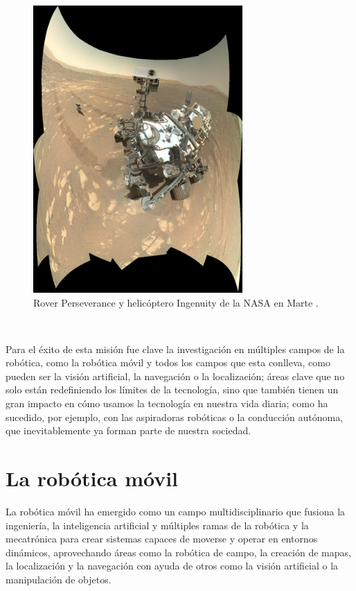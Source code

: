 \begin{figure} [h!]
  \begin{center}
    \includegraphics[width=8cm]{figs/perseverance_ingenuity_selfie_panorama}
  \end{center}
  \caption{Rover Perseverance y helicóptero Ingenuity de la NASA en Marte \cite{perseverance_ingenuity}.}
  \label{fig:rover}
\end{figure}\

Para el éxito de esta misión fue clave la investigación en múltiples campos de
la robótica, como la robótica móvil y todos los campos que esta conlleva, como
pueden ser la visión artificial, la navegación o la localización; áreas clave
que no solo están redefiniendo los límites de la tecnología, sino que también
tienen un gran impacto en cómo usamos la tecnología en nuestra vida diaria; como
ha sucedido, por ejemplo, con las aspiradoras robóticas o la conducción
autónoma, que inevitablemente ya forman parte de nuestra sociedad.



\section{La robótica móvil}
\label{sec:robotica_movil} %

La robótica móvil ha emergido como un campo multidisciplinario que fusiona la
ingeniería, la inteligencia artificial y múltiples ramas de la robótica y la
mecatrónica para crear sistemas capaces de moverse y operar en entornos
dinámicos, aprovechando áreas como la robótica de campo, la creación de mapas,
la localización y la navegación con ayuda de otros como la visión artificial o
la manipulación de objetos.
\\

